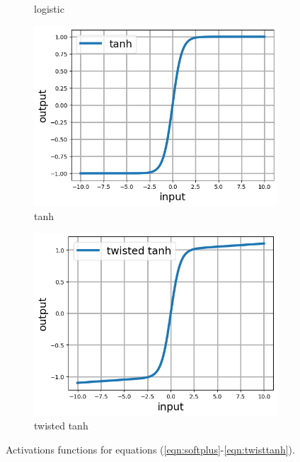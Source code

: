 \documentclass[12pt]{article}
\begin{document}
\begin{figure}[h]
\begin{subfigure}[b]{0.45\linewidth}
    \caption{logistic}
  \end{subfigure}
  \begin{subfigure}[b]{0.45\linewidth}
    \includegraphics[totalheight=4cm]{Figures/scripts/tanh.png}
    \caption{tanh}
  \end{subfigure}
  \begin{subfigure}[b]{0.45\linewidth}
    \includegraphics[totalheight=4cm]{Figures/scripts/twistedtanh.png}
    \caption{twisted tanh}
  \end{subfigure}
\caption{\label{fig:activations} Activations functions for equations (\ref{eqn:softplus}-\ref{eqn:twisttanh}).}
\end{figure}
\end{document}
